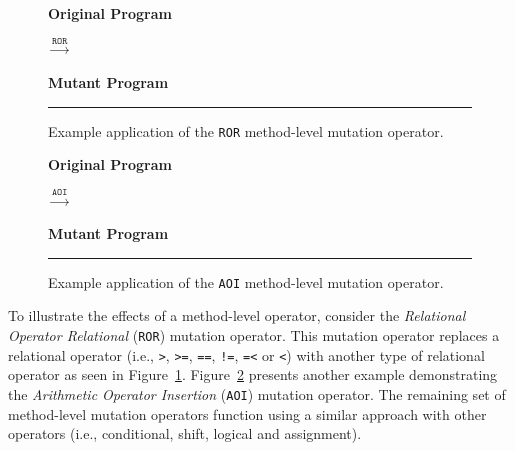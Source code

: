 \begin{figure}[!tb]
  \centering
  \begin{minipage}{6.5cm}
  \centering
  \footnotesize{\textbf{Original Program}}
  
  \end{minipage}
  $\xrightarrow{\texttt{ROR}}$
  \begin{minipage}{6.5cm}
  \centering
  \footnotesize{\textbf{Mutant Program}}
  
  \end{minipage}
  \caption{Example application of the \texttt{ROR} method-level mutation operator.}
  \vspace{2mm}
  \hrule
  \label{fig:ROR_mutation}
\end{figure}

\begin{figure}[!tb]
  \centering
  \begin{minipage}{6.5cm}
  \centering
  \footnotesize{\textbf{Original Program}}
  
  \end{minipage}
  $\xrightarrow{\texttt{AOI}}$
  \begin{minipage}{6.5cm}
  \centering
  \footnotesize{\textbf{Mutant Program}}
  
  \end{minipage}
  \caption{Example application of the \texttt{AOI} method-level mutation operator.}
  \vspace{2mm}
  \hrule
  \label{fig:AOI_mutation}
\end{figure}

To illustrate the effects of a method-level operator, consider the \emph{Relational Operator Relational} (\texttt{ROR}) mutation operator. This mutation operator replaces a relational operator (i.e., \texttt{>}, \texttt{>=}, \texttt{==}, \texttt{!=}, \texttt{=<} or \texttt{<}) with another type of relational operator as seen in Figure~\ref{fig:ROR_mutation}. Figure~\ref{fig:AOI_mutation} presents another example demonstrating the \emph{Arithmetic Operator Insertion} (\texttt{AOI}) mutation operator. The remaining set of method-level mutation operators function using a similar approach with other operators (i.e., conditional, shift, logical and assignment).

